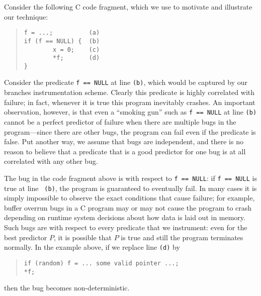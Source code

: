Consider the following C code fragment, which we use to motivate and illustrate
our technique:
\begin{quote}
\begin{verbatim}
f = ...;          (a)
if (f == NULL) {  (b)
        x = 0;    (c)
        *f;       (d)
}
\end{verbatim}
\end{quote}
Consider the predicate {\tt f == NULL} at line {\tt (b)}, which would
be captured by our branches instrumentation scheme.  Clearly
this predicate is highly correlated with failure; in fact, whenever it
is true this program inevitably crashes.  An important observation,
however, is that even a ``smoking gun'' such as {\tt f == NULL} at
line {\tt (b)} cannot be a perfect predictor of failure when there are
multiple bugs in the program---since there are other bugs, the program can fail
even if the predicate is false.  Put another way, we assume
that bugs are independent, and there is no reason to believe that
a predicate that is a good predictor for one bug is at all correlated
with any other bug.

The bug in the code fragment above is  with
respect to {\tt f == NULL}: if {\tt f == NULL} is true at line {\tt
(b)}, the program is guaranteed to eventually fail.  In many cases it
is simply impossible to observe the exact conditions that cause
failure; for example, buffer overrun bugs in a C program may or may
not cause the program to crash depending on runtime system decisions
about how data is laid out in memory.  Such bugs are
 with respect to every predicate that we instrument:
even for the best predictor $P$, it is possible that $P$ is true and
still the program terminates normally.  In the example above, if we replace line
{\tt (d)} by
\begin{quote}
\begin{verbatim}
if (random) f = ... some valid pointer ...;
*f;
\end{verbatim}
\end{quote}
then the bug becomes non-deterministic.


